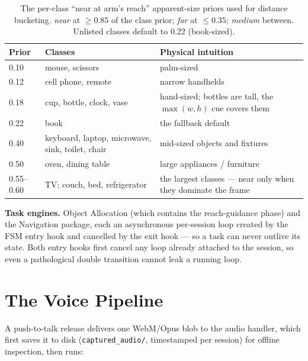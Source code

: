 \begin{table}[!htbp]
\centering
\caption[Per-class distance priors]{The per-class ``near at arm's reach''
apparent-size priors used for distance bucketing. \emph{near} at ${\geq}0.85$ of
the class prior; \emph{far} at ${\leq}0.35$; \emph{medium} between. Unlisted
classes default to 0.22 (book-sized).}
\label{tab:priors}
\small
\begin{tabular}{p{1.6cm} p{5.6cm} p{5.4cm}}
\toprule
\textbf{Prior} & \textbf{Classes} & \textbf{Physical intuition} \\
\midrule
0.10 & mouse, scissors & palm-sized \\
0.12 & cell phone, remote & narrow handhelds \\
0.18 & cup, bottle, clock, vase & hand-sized; bottles are tall, the $\max(w,h)$ cue covers them \\
0.22 & book & the fallback default \\
0.40 & keyboard, laptop, microwave, sink, toilet, chair & mid-sized objects and fixtures \\
0.50 & oven, dining table & large appliances / furniture \\
0.55--0.60 & TV; couch, bed, refrigerator & the largest classes --- near only when they dominate the frame \\
\bottomrule
\end{tabular}
\end{table}

\textbf{Task engines.} Object Allocation (which contains the reach-guidance phase)
and the Navigation package, each an asynchronous per-session loop created by the
FSM entry hook and cancelled by the exit hook --- so a task can never outlive its
state. Both entry hooks first cancel any loop already attached to the session, so
even a pathological double transition cannot leak a running loop.

\section{The Voice Pipeline}
\label{sec:voice_pipeline}

A push-to-talk release delivers one WebM/Opus blob to the audio handler, which
first saves it to disk (\texttt{captured\_audio/}, timestamped per session) for
offline inspection, then runs:

